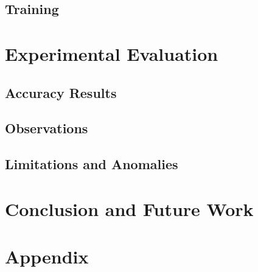 \documentclass[11pt]{article}
\begin{document}
\subsection{Training}

\section{Experimental Evaluation}
\subsection{Accuracy Results}

\subsection{Observations}

\subsection{Limitations and Anomalies}

\section{Conclusion and Future Work}

\appendix
\section*{Appendix}

\begin{thebibliography}{9}
\end{thebibliography}
\end{document}
